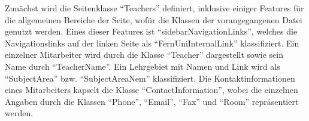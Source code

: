     

    Zunächst wird die Seitenklasse "`Teachers"' definiert,
    inklusive einiger Features für die allgemeinen Bereiche der Seite,
    wofür die Klassen der vorangegangenen Datei genutzt werden.
    Eines dieser Features ist "`sidebarNavigationLinks"',
    welches die Navigationslinks auf der linken Seite als "`FernUniInternalLink"'
    klassifiziert.
    Ein einzelner Mitarbeiter wird durch die Klasse "`Teacher"' dargestellt
    sowie sein Name durch "`TeacherName"'.
    Ein Lehrgebiet mit Namen und Link wird als "`SubjectArea"' bzw. "`SubjectAreaNem"' klassifiziert.
    Die Kontaktinformationen eines Mitarbeiters kapselt die Klasse "`ContactInformation"',
    wobei die einzelnen Angaben durch die Klassen "`Phone"', "`Email"', "`Fax"' und "`Room"'
    repräsentiert werden.

